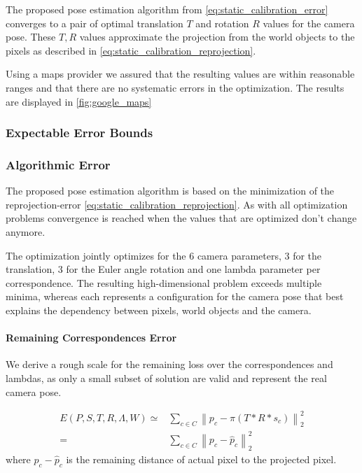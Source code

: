 The proposed pose estimation algorithm from \autoref{eq:static_calibration_error} converges to a pair of optimal translation $T$ and rotation $R$ values for the camera pose.
These $T, R$ values approximate the projection from the world objects to the pixels as described in \autoref{eq:static_calibration_reprojection}.

Using a maps provider we assured that the resulting values are within reasonable ranges and that there are no systematic errors in the optimization.
The results are displayed in \autoref{fig:google_maps}

\subsubsection{Expectable Error Bounds}

\subsubsection{Algorithmic Error}
The proposed pose estimation algorithm is based on the minimization of the reprojection-error \autoref{eq:static_calibration_reprojection}.
As with all optimization problems convergence is reached when the values that are optimized don't change anymore.

The optimization jointly optimizes for the 6 camera parameters, 3 for the translation, 3 for the Euler angle rotation and one lambda parameter per correspondence.
The resulting high-dimensional problem exceeds multiple minima, whereas each represents a configuration for the camera pose that best explains the dependency between pixels, world objects and the camera. 

\paragraph{Remaining Correspondences Error}
We derive a rough scale for the remaining loss over the correspondences and lambdas, as only a small subset of solution are valid and represent the real camera pose.

\begin{equation}
  \label{eq:static_calibration_correspondence_error}
  \begin{split}
  E(P, S, T, R, \Lambda, W ) \simeq &
  \sum_{c \in C} 
  \left\lVert 
     p_c - \pi(T * R * s_c) 
  \right\rVert_2^2  \\
  = & 
  \sum_{c \in C} 
  \left\lVert 
     p_c - \hat{p}_c 
  \right\rVert_2^2 
  \end{split}
\end{equation}
where $p_c - \hat{p}_c$ is the remaining distance of actual pixel to the projected pixel.

